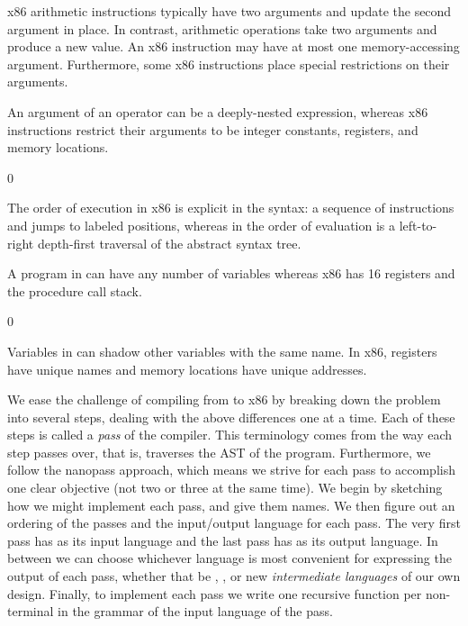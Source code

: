 \documentclass[7x10]{TimesAPriori_MIT}%
\def\racketEd{0}
\def\edition{1}
\begin{document}
\begin{enumerate}
\item x86 arithmetic instructions typically have two arguments and
  update the second argument in place. In contrast, \LangVar{}
  arithmetic operations take two arguments and produce a new value.
  An x86 instruction may have at most one memory-accessing argument.
  Furthermore, some x86 instructions place special restrictions on
  their arguments.

\item An argument of an \LangVar{} operator can be a deeply-nested
  expression, whereas x86 instructions restrict their arguments to be
  integer constants, registers, and memory locations.

{\if\edition\racketEd      
\item The order of execution in x86 is explicit in the syntax: a
  sequence of instructions and jumps to labeled positions, whereas in
  \LangVar{} the order of evaluation is a left-to-right depth-first
  traversal of the abstract syntax tree.
\fi}

\item A program in \LangVar{} can have any number of variables
  whereas x86 has 16 registers and the procedure call stack.
{\if\edition\racketEd    
\item Variables in \LangVar{} can shadow other variables with the
  same name. In x86, registers have unique names and memory locations
  have unique addresses.
\fi}  
\end{enumerate}

We ease the challenge of compiling from \LangVar{} to x86 by breaking
down the problem into several steps, dealing with the above
differences one at a time. Each of these steps is called a \emph{pass}
of the compiler.
%
This terminology comes from the way each step passes over, that is,
traverses the AST of the program.
%
Furthermore, we follow the nanopass approach, which means we strive
for each pass to accomplish one clear objective (not two or three at
the same time).
%
We begin by sketching how we might implement each pass, and give them
names.  We then figure out an ordering of the passes and the
input/output language for each pass. The very first pass has
\LangVar{} as its input language and the last pass has \LangXInt{} as
its output language. In between we can choose whichever language is
most convenient for expressing the output of each pass, whether that
be \LangVar{}, \LangXInt{}, or new \emph{intermediate languages} of
our own design.  Finally, to implement each pass we write one
recursive function per non-terminal in the grammar of the input
language of the pass.  
\end{document}
